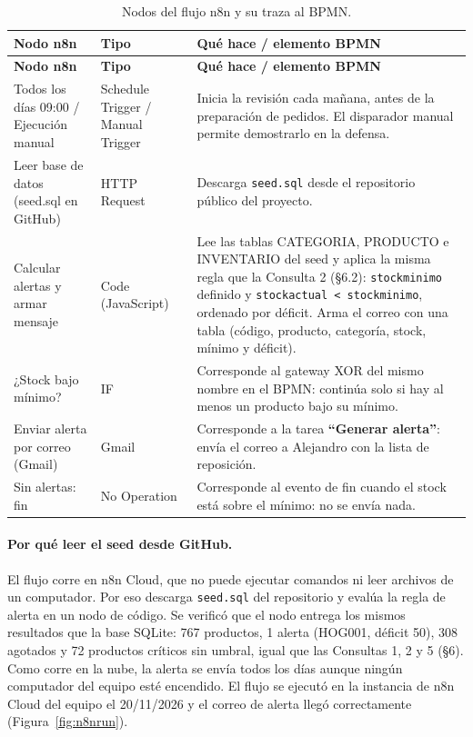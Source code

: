 \documentclass[11pt,letterpaper]{article}
\renewcommand{\_}{\oldus\allowbreak}
\begin{document}
\begin{small}
\begin{longtable}{>{\raggedright\arraybackslash}p{3.3cm} >{\raggedright\arraybackslash}p{2.5cm} >{\raggedright\arraybackslash}p{9.2cm}}
\caption{Nodos del flujo n8n y su traza al BPMN.}\label{tab:n8n}\\
\toprule
\textbf{Nodo n8n} & \textbf{Tipo} & \textbf{Qué hace / elemento BPMN} \\
\midrule
\endfirsthead
\toprule
\textbf{Nodo n8n} & \textbf{Tipo} & \textbf{Qué hace / elemento BPMN} \\
\midrule
\endhead
\bottomrule
\endfoot
Todos los días 09:00 / Ejecución manual & Schedule Trigger / Manual Trigger & Inicia la revisión cada mañana, antes de la preparación de pedidos. El disparador manual permite demostrarlo en la defensa. \\
Leer base de datos (seed.sql en GitHub) & HTTP Request & Descarga \texttt{seed.sql} desde el repositorio público del proyecto. \\
Calcular alertas y armar mensaje & Code (JavaScript) & Lee las tablas CATEGORIA, PRODUCTO e INVENTARIO del seed y aplica la misma regla que la Consulta 2 (§6.2): \texttt{stock\_minimo} definido y \texttt{stock\_actual < stock\_minimo}, ordenado por déficit. Arma el correo con una tabla (código, producto, categoría, stock, mínimo y déficit). \\
¿Stock bajo mínimo? & IF & Corresponde al gateway XOR del mismo nombre en el BPMN: continúa solo si hay al menos un producto bajo su mínimo. \\
Enviar alerta por correo (Gmail) & Gmail & Corresponde a la tarea \textbf{“Generar alerta”}: envía el correo a Alejandro con la lista de reposición. \\
Sin alertas: fin & No Operation & Corresponde al evento de fin cuando el stock está sobre el mínimo: no se envía nada. \\
\end{longtable}
\end{small}

\paragraph{Por qué leer el seed desde GitHub.} El flujo corre en n8n Cloud, que no puede ejecutar comandos ni leer archivos de un computador. Por eso descarga \texttt{seed.sql} del repositorio y evalúa la regla de alerta en un nodo de código. Se verificó que el nodo entrega los mismos resultados que la base SQLite: 767 productos, 1 alerta (HOG001, déficit 50), 308 agotados y 72 productos críticos sin umbral, igual que las Consultas 1, 2 y 5 (§6). Como corre en la nube, la alerta se envía todos los días aunque ningún computador del equipo esté encendido. El flujo se ejecutó en la instancia de n8n Cloud del equipo el 20/11/2026 y el correo de alerta llegó correctamente (Figura~\ref{fig:n8nrun}).
\end{document}
